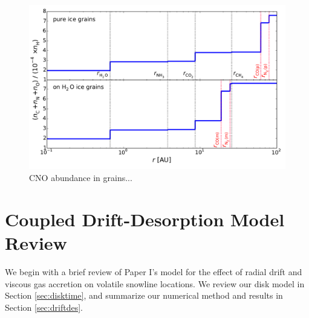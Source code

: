 \documentclass[apj]{emulateapj}
\newcommand{\emgr}[1]{\emph{ \color{gray} #1}}
\begin{document}

\begin{figure}[t!]
\centering
\includegraphics[width=\textwidth]{../../figs/CNO_and_snowlines_2.pdf}
\caption{CNO abundance in grains...} 
\label{fig:CNOstatic}
\end{figure}

\section{Coupled Drift-Desorption Model Review}
\label{sec:review}

We begin with a brief review of Paper I's model for the effect of radial drift and viscous gas accretion on volatile snowline locations. We review our disk model in Section \ref{sec:disktime}, and summarize our numerical method and results in Section \ref{sec:driftdes}.
\end{document}
